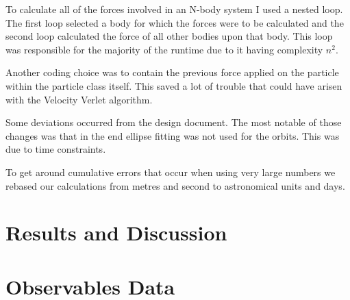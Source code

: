 \documentclass[a4paper, 11pt, british, left=1in, right=1in, top=0.3in, bottom=1in]{article}
\begin{document}
	To calculate all of the forces involved in an N-body system I used a nested loop. The first loop selected a body for which the forces were to be calculated and the second loop calculated the force of all other bodies upon that body. This loop was responsible for the majority of the runtime due to it having complexity $n^2$. 
	
	Another coding choice was to contain the previous force applied on the particle within the particle class itself. This saved a lot of trouble that could have arisen with the Velocity Verlet algorithm.
	
	Some deviations occurred from the design document. The most notable of those changes was that in the end ellipse fitting was not used for the orbits. This was due to time constraints.
	
	To get around cumulative errors that occur when using very large numbers we rebased our calculations from metres and second to astronomical units and days. 
	\section{Results and Discussion}
	
	
	\appendix
	\clearpage
	\section{Observables Data}
	
\end{document}
